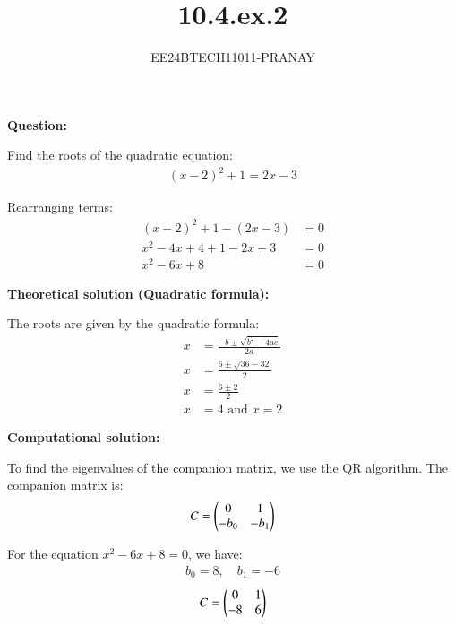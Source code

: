 \documentclass[journal]{IEEEtran}
\begin{document}

\vspace{3cm}

\title{10.4.ex.2}
\author{EE24BTECH11011-PRANAY}
{\let\newpage\relax\maketitle}

\renewcommand{\thefigure}{\theenumi}
\renewcommand{\thetable}{\theenumi}
\setlength{\intextsep}{10pt}

\renewcommand{\thetable}{\theenumi}

\textbf{Question:}

Find the roots of the quadratic equation:
\begin{align}
    (x-2)^2 + 1 = 2x - 3
\end{align}

\solution

Rearranging terms:
\begin{align}
    (x-2)^2 + 1 - (2x - 3) &= 0 \\
    x^2 - 4x + 4 + 1 - 2x + 3 &= 0 \\
    x^2 - 6x + 8 &= 0
\end{align}

\textbf{Theoretical solution (Quadratic formula):}

The roots are given by the quadratic formula:
\begin{align}
    x &= \frac{-b \pm \sqrt{b^2 - 4ac}}{2a} \\
    x &= \frac{6 \pm \sqrt{36 - 32}}{2} \\
    x &= \frac{6 \pm 2}{2} \\
    x &= 4 \text{ and } x = 2
\end{align}

\textbf{Computational solution:}

To find the eigenvalues of the companion matrix, we use the QR algorithm. The companion matrix  is:
\begin{align}
    C = \begin{pmatrix}0 & 1 \\ -b_0 & -b_1\end{pmatrix}
\end{align}

For the equation $x^2 - 6x + 8 = 0$, we have:
\begin{align}
    b_0 = 8, \quad b_1 = -6
\end{align}
\begin{align}
    C = \begin{pmatrix}0 & 1 \\ -8 & 6\end{pmatrix}
\end{align}
\end{document}
